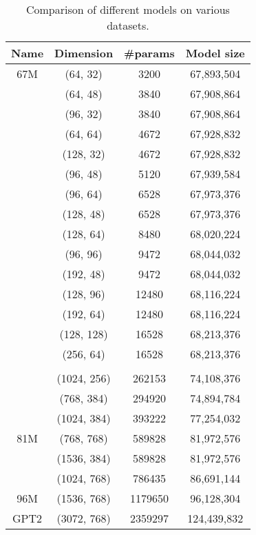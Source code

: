 \documentclass{article}
\begin{document}
{\begin{table}[htb!]
\centering
\begin{tabular}{|c|c|c|c|}
\hline
Name 	& Dimension 		& 	#params 	& Model size\\
\hline
67M		&  (64, 32)         &   3200       & 67,893,504  \\ \hline 
		&  (64, 48)         &   3840       & 67,908,864  \\ \hline 
		&  (96, 32)         &   3840       & 67,908,864  \\ \hline
		&  (64, 64)         &   4672       & 67,928,832  \\ \hline
		&  (128, 32)        &   4672       & 67,928,832  \\ \hline 
		&  (96, 48)         &   5120       & 67,939,584  \\ \hline 
		&  (96, 64)         &   6528       & 67,973,376  \\ \hline
		&  (128, 48)        &   6528       & 67,973,376  \\ \hline
		&  (128, 64)        &   8480       & 68,020,224  \\ \hline 
		&  (96, 96)         &   9472       & 68,044,032  \\ \hline 
		&  (192, 48)        &   9472       & 68,044,032  \\ \hline
		&  (128, 96)        &   12480      & 68,116,224  \\ \hline
		&  (192, 64)        &   12480      & 68,116,224  \\ \hline 
		&  (128, 128)       &   16528      & 68,213,376  \\ \hline 
		&  (256, 64)        &   16528      & 68,213,376  \\ \hline
		&  \cdots &   \cdots    & \cdots \\ \hline
		&  (1024, 256)      &   262153     & 74,108,376  \\ \hline 
		&  (768, 384)       &   294920     & 74,894,784  \\ \hline
		&  (1024, 384)      &   393222     & 77,254,032  \\ \hline
81M 	&  (768, 768)       &   589828     & 81,972,576  \\ \hline
		&  (1536, 384)      &   589828     & 81,972,576  \\ \hline
		&  (1024, 768)      &   786435     & 86,691,144  \\ \hline
96M		&  (1536, 768)      &   1179650    & 96,128,304  \\ \hline
GPT2	&  (3072, 768)      &   2359297    & 124,439,832 \\ \hline
\end{tabular}
\caption{Comparison of different models on various datasets.}
\end{table}

}
\end{document}
